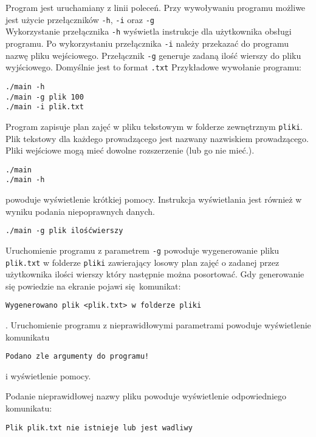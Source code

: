 \documentclass[12pt,a4paper,twoside]{article}
\begin{document}
Program jest uruchamiany z linii poleceń. 
Przy wywoływaniu programu możliwe jest użycie przełączników  \texttt{-h},  \texttt{-i} oraz \texttt{-g}\\
Wykorzystanie przełącznika  \texttt{-h} wyświetla instrukcje dla użytkownika obsługi programu. 
Po wykorzystaniu przełącznika  \texttt{-i} należy przekazać do programu nazwę pliku wejściowego.
Przełącznik \texttt{-g} generuje zadaną ilość wierszy do pliku wyjściowego. Domyślnie jest to format \texttt{.txt} \newline \newline
Przykładowe wywołanie programu:
\begin{verbatim}
./main -h
./main -g plik 100
./main -i plik.txt
\end{verbatim}

Program zapisuje plan zajęć w pliku tekstowym w folderze zewnętrznym \texttt{pliki}. Plik tekstowy dla każdego prowadzącego jest nazwany nazwiskiem prowadzącego.
Pliki wejściowe mogą mieć dowolne rozszerzenie (lub go nie mieć.).

\begin{verbatim}
./main 
./main -h
\end{verbatim}
powoduje wyświetlenie krótkiej pomocy. Instrukcja wyświetlania jest również w wyniku podania niepoprawnych danych. 

\begin{verbatim}
./main -g plik ilośćwierszy
\end{verbatim}
Uruchomienie programu z parametrem \texttt{-g} powoduje wygenerowanie pliku \texttt{plik.txt} w folderze \texttt{pliki} zawierający losowy plan zajęć o zadanej przez użytkownika ilości wierszy który następnie można posortować. Gdy generowanie się powiedzie na ekranie pojawi się komunikat:
\begin{verbatim}
Wygenerowano plik <plik.txt> w folderze pliki
\end{verbatim}. \newline
Uruchomienie programu z nieprawidłowymi parametrami powoduje wyświetlenie komunikatu
\begin{verbatim}
Podano zle argumenty do programu!
\end{verbatim}
i wyświetlenie pomocy. \newline 

Podanie nieprawidłowej nazwy pliku powoduje wyświetlenie odpowiedniego komunikatu:
\begin{verbatim}
Plik plik.txt nie istnieje lub jest wadliwy
\end{verbatim}
\end{document}
